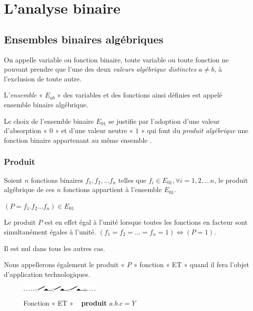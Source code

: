 \ifdefined\COMPLETE
\else
    
    
\fi

\chapter{L'analyse binaire}

\section{Ensembles binaires algébriques}

On appelle variable ou fonction binaire, toute variable ou toute fonction
ne pouvant prendre que l'une des deux \textit{valeurs algébrique distinctes
$a\neq b$}, à l'exclusion de toute autre.

L'\textit{ensemble} «  $E_{ab}$  » des variables et des fonctions
ainsi définies est appelé {ensemble binaire algébrique}.

Le choix de l'ensemble binaire $E_{01}$ se justifie par l'adoption
d'une valeur d'absorption « $0$ » et d'une valeur neutre « $1$ » qui
font du \textit{produit algébrique} une fonction binaire appartenant
au même ensemble .

\subsection{Produit}

Soient $n$ fonctions binaires $f_{1},f_{2},\ldots f_{n}$ telles
que $f_{i}\in E_{01},\forall i=1,2,\ldots n$, le produit algébrique
de ces $n$ fonctions appartient à l'ensemble $E_{01}$.

\centerline{$(P=f_{1}.f_{2}\ldots f_{n})\in E_{01}$}

Le produit $P$ est en effet égal à l'unité lorsque toutes les fonctions
en facteur sont simultanément égales à l'unité. $(f_{1}=f_{2}=\ldots=f_{n}=1)\Longleftrightarrow(P=1)$.

Il est nul dans tous les autres cas.

Nous appellerons également le produit « $P$ » fonction « ET » quand
il fera l'objet d'ap\-pli\-ca\-tion technologiques.

\bigskip 

\begin{figure}[htb]
\begin{centering}
\includegraphics[width=4cm]{Figures/ET} \vspace{1cm}
\par\end{centering}
\caption{Fonction « ET » ~\textendash{} \textbf{produit} $a.b.c=Y$}
\label{fig:ET} 
\end{figure}



